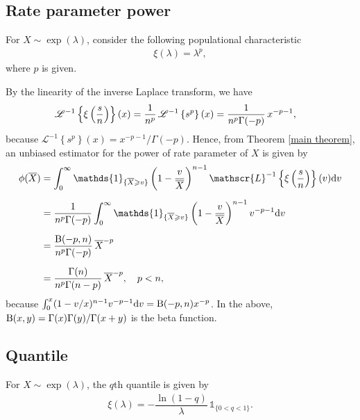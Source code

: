 \documentclass[12pt]{article}
\theoremstyle{definition}
\begin{document}
\subsection{Rate parameter power}\label{Rate parameter power}

For  $X\sim\exp(\lambda)$, consider the following populational characteristic
\begin{align*}
	\xi(\lambda)
	=
	\lambda^p,
\end{align*}
where $p$ is given. 

By the linearity of the inverse Laplace transform, we have
\begin{align*}
	\mathscr{L}^{-1}\left\{	
	{\displaystyle \xi\left({s\over n}\right)}
	\right\}
	(x)
	=
	{1\over n^p } \,
	\mathscr{L}^{-1}&\left\{	
	{\displaystyle 	
		s^{p}
	}
	\right\}
	(x)
	=
	{1\over n^p \Gamma(-p)} \,
	{x^{-p-1}},
\end{align*}
because $\mathscr{L}^{-1}\left\{	
s^{p}
\right\}(x)=x^{-p-1}/\Gamma(-p)$.
Hence, from Theorem \ref{main theorem}, an unbiased estimator for the power of rate parameter of  $X$ is given by
\begin{align}
	\phi(\overline{X})
	&=
	\int_0^{\infty} 
	\mathds{1}_{\{\overline{X}\geqslant v\}}
	\left(1-{v\over \overline{X}}\right)^{n-1} 
	\mathscr{L}^{-1}\left\{\xi\left({s\over n}\right)
	\right\}(v){\rm d}v
	\nonumber
	\\[0,2cm]
	&=
	{1\over n^p \Gamma(-p)} 
	\int_0^{\infty} 
	\mathds{1}_{\{\overline{X}\geqslant v\}}
	\left(1-{v\over \overline{X}}\right)^{n-1} 
	{v^{-p-1}}
	{\rm d}v
	\nonumber
	\\[0,2cm]
	&=
	{{\rm B}(-p,n)\over n^p \Gamma(-p)}  \, \overline{X}^{-p}
	\nonumber
	\\[0,2cm]
	&=
	{\Gamma(n)\over n^p\Gamma(n-p)}  \, \overline{X}^{-p},
    \quad p<n,
	\label{formula-power}
\end{align}
because $\int_0^x (1-v/x)^{n-1} v^{-p-1}{\rm d}v={\rm B}(-p,n)x^{-p}$. In the above, ${\rm B}(x,y)=\Gamma(x)\Gamma(y)/\Gamma(x+y)$ is the beta function.






\subsection{Quantile}\label{q-quantile}

For  $X\sim\exp(\lambda)$,  the   $q$th quantile is given by
\begin{align*}
	\xi(\lambda)={-{\dfrac {\ln(1-q)}{\lambda }}} \, \mathds{1}_{\{0<q<1\}}.
\end{align*}
\end{document}
